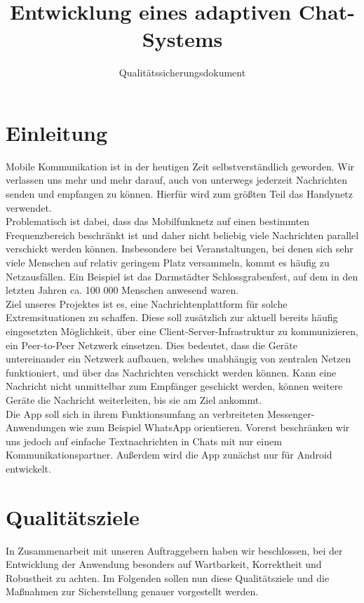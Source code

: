\documentclass[accentcolor=tud0b,12pt,paper=a4]{tudreport}
\title{Entwicklung eines adaptiven Chat-Systems}
\subtitle{Qualitätssicherungsdokument}
\begin{document}
  \maketitle
  \tableofcontents

  \chapter{Einleitung}
    Mobile Kommunikation ist in der heutigen Zeit selbstverständlich geworden. Wir verlassen uns mehr und mehr darauf, auch von unterwegs jederzeit Nachrichten senden und empfangen zu können. Hierfür wird zum größten Teil das Handynetz verwendet.\\

    Problematisch ist dabei, dass das Mobilfunknetz auf einen bestimmten Frequenzbereich beschränkt ist und daher nicht beliebig viele Nachrichten parallel verschickt werden können. Insbesondere bei Veranstaltungen, bei denen sich sehr viele Menschen auf relativ geringem Platz versammeln, kommt es häufig zu Netzausfällen. Ein Beispiel ist das Darmstädter Schlossgrabenfest, auf dem in den letzten Jahren ca. 100 000 Menschen anwesend waren.\\

    Ziel unseres Projektes ist es, eine Nachrichtenplattform für solche Extremsituationen zu schaffen. Diese soll zusätzlich zur aktuell bereits häufig eingesetzten Möglichkeit, über eine Client-Server-Infrastruktur zu kommunizieren, ein Peer-to-Peer Netzwerk einsetzen. Dies bedeutet, dass die Geräte untereinander ein Netzwerk aufbauen, welches unabhängig von zentralen Netzen funktioniert, und über das Nachrichten verschickt werden können. Kann eine Nachricht nicht unmittelbar zum Empfänger geschickt werden, können weitere Geräte die Nachricht weiterleiten, bis sie am Ziel ankommt.\\

    Die App soll sich in ihrem Funktionsumfang an verbreiteten Messenger-Anwendungen wie zum Beispiel WhatsApp orientieren. Vorerst beschränken wir uns jedoch auf einfache Textnachrichten in Chats mit nur einem Kommunikationspartner. Außerdem wird die App zunächst nur für Android entwickelt.

  \chapter{Qualitätsziele}
    In Zusammenarbeit mit unseren Auftraggebern haben wir beschlossen, bei der Entwicklung der Anwendung besonders auf Wartbarkeit, Korrektheit und Robustheit zu achten. Im Folgenden sollen nun diese Qualitätsziele und die Maßnahmen zur Sicherstellung genauer vorgestellt werden.
\end{document}
